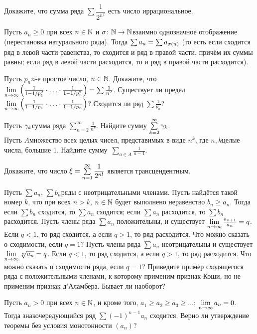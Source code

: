 \documentclass[a4paper,12pt]{article}
\begin{document}
Докажите, что сумма ряда $\sum\dfrac{1}{2^{n^2}}$ есть число иррациональное.

Пусть $a_n \ge 0$ при всех $n\in\mathbb{N}$ и $\sigma\colon\mathbb{N}\rightarrow\mathbb{N}$\т взаимно однозначное отображение (перестановка натурального ряда). Тогда $\sum a_n = \sum a_{\sigma(n)}$ (то есть если сходится ряд в левой части равенства, то сходится и ряд в правой части, причём их суммы равны; если ряд в левой части расходится, то и ряд в правой части расходится).

Пусть $p_n$\т $n$-е простое число, $n\in\mathbb{N}$.
Докажите, что
$\lim\limits_{n \rightarrow \infty}\left(\frac1{1-1/p_1^2}\cdot\ldots\cdot\frac1{1-1/p_n^2}\right) = \sum \frac1{n^2}$.
Существует ли предел $\lim\limits_{n \rightarrow \infty}\left(\frac1{1-1/p_1}\cdot\ldots\cdot\frac1{1-1/p_n}\right)$?
Сходится ли ряд $\sum\frac1{p_n}$?


Пусть $\gamma_k$\т сумма ряда $\sum\limits_{n=2}^{\infty}\frac1{n^k}$. Найдите сумму $\sum\limits_{k=2}^{\infty}\gamma_k$.\\
Пусть $A$\т множество всех целых чисел, представимых в виде $n^k$, где $n,k$\т целые числа, большие 1. Найдите сумму~\hbox{$\sum\limits_{a\in A}\frac1{a-1}$}.

Докажите, что число $\xi = \sum\limits_{n=1}^{\infty}\dfrac1{2^{n!}}$ является трансцендентным.

\newpage
{}

Пусть $\sum a_n$, $\sum b_n$\т ряды с неотрицательными членами. Пусть найдётся такой номер $k$, что при всех $n>k$, $n\in\mathbb{N}$ будет выполнено неравенство $b_n\ge a_n$. Тогда если $\sum b_n$ сходится, то $\sum a_n$ сходится; если $\sum a_n$ расходится, то $\sum b_n$ расходится.
Пусть члены ряда $\sum a_n$ положительны, и существует $\lim\limits_{n \rightarrow \infty} \frac{a_{n+1}}{a_n}=q$. Если $q<1$, то ряд сходится, а если
$q>1$, то ряд расходится. Что можно сказать о сходимости, если $q=1$?
Пусть члены ряда $\sum a_n$ неотрицательны и существует $\lim\limits_{n \rightarrow \infty} \sqrt[n]{a_n}=q$. Если $q<1$, то ряд сходится, а если $q>1$, то ряд расходится. Что можно сказать о сходимости ряда, если $q=1$?
Приведите пример сходящегося ряда с положительными членами, к которому применим признак Коши, но не применим признак д'Аламбера. Бывает ли наоборот?

Пусть $a_n>0$ при всех $n\in\mathbb{N}$, и кроме того, $a_1\ge a_2\ge a_3\ge\dots$; $\lim\limits_{n \rightarrow \infty} a_n=0$. Тогда знакочередующийся ряд $\sum (-1)^{n-1}a_n$ сходится.
Верно ли утверждение теоремы без условия монотонности $(a_n)$?
\end{document}
